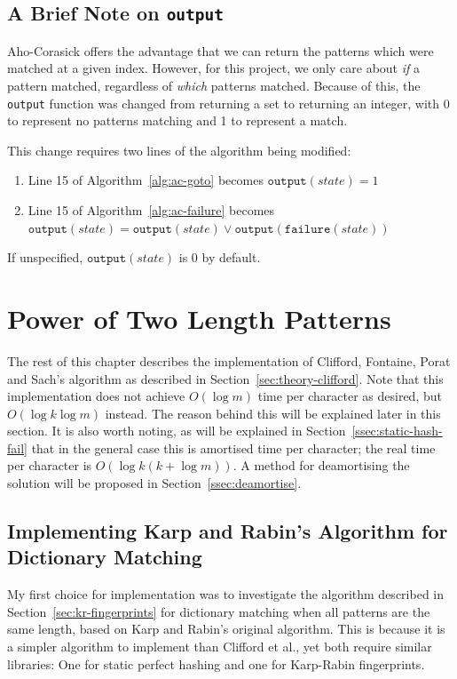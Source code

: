 \documentclass[ %
                    author={Dominic Joseph Moylett},
                    degree={MEng},
                     title={Dictionary Matching with Fingerprints},
                  subtitle={An Empirical Analysis},
                      type={research},
                      year={2015} ]{dissertation}
\begin{document}
\subsection{A Brief Note on \texttt{output}}

Aho-Corasick offers the advantage that we can return the patterns which were matched at a given index. However, for this project, we only care about \textit{if} a pattern matched, regardless of \textit{which} patterns matched. Because of this, the \texttt{output} function was changed from returning a set to returning an integer, with 0 to represent no patterns matching and 1 to represent a match.

This change requires two lines of the algorithm being modified:

\begin{enumerate}
  \item Line 15 of Algorithm~\ref{alg:ac-goto} becomes $\texttt{output}(state) = 1$
  \item Line 15 of Algorithm~\ref{alg:ac-failure} becomes $\texttt{output}(state) = \texttt{output}(state) \vee \texttt{output}(\texttt{failure}(state))$
\end{enumerate}

If unspecified, $\texttt{output}(state)$ is 0 by default.

\section{Power of Two Length Patterns}

The rest of this chapter describes the implementation of Clifford, Fontaine, Porat and Sach's \cite{2015arXiv150406242C} algorithm as described in Section~\ref{sec:theory-clifford}. Note that this implementation does not achieve $O(\log m)$ time per character as desired, but $O(\log k\log m)$ instead. The reason behind this will be explained later in this section. It is also worth noting, as will be explained in Section~\ref{ssec:static-hash-fail} that in the general case this is amortised time per character; the real time per character is $O(\log k(k + \log m))$. A method for deamortising the solution will be proposed in Section~\ref{ssec:deamortise}.

\subsection{Implementing Karp and Rabin's Algorithm for Dictionary Matching}

My first choice for implementation was to investigate the algorithm described in Section~\ref{sec:kr-fingerprints} for dictionary matching when all patterns are the same length, based on Karp and Rabin's original algorithm. This is because it is a simpler algorithm to implement than Clifford et al., yet both require similar libraries: One for static perfect hashing and one for Karp-Rabin fingerprints.
\end{document}
